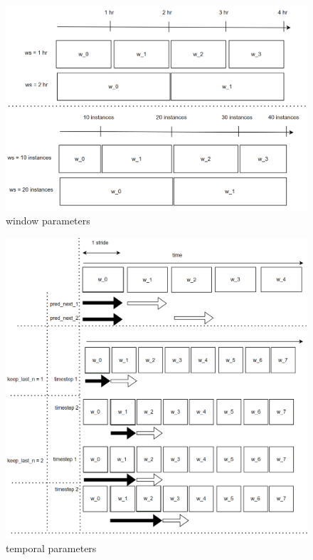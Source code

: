 \documentclass{IEEEtran}
\begin{document}
\begin{figure}[htbp]
\centering
\includegraphics[width=.9\linewidth]{./images/screenshot_20220321_110302.png}
\caption{\label{window parameters}window parameters}
\end{figure}

\begin{figure}[htbp]
\centering
\includegraphics[width=.9\linewidth]{./images/screenshot_20220321_130701.png}
\caption{\label{temporal parameters}temporal parameters}
\end{figure}
\end{document}
